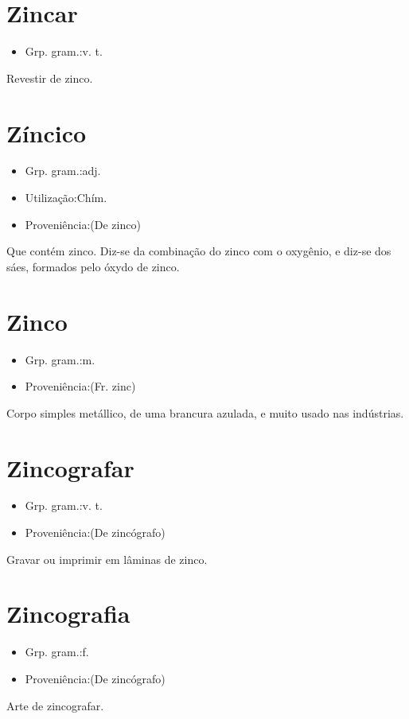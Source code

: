 \section{Zincar}
\begin{itemize}
\item {Grp. gram.:v. t.}
\end{itemize}
Revestir de zinco.
\section{Zíncico}
\begin{itemize}
\item {Grp. gram.:adj.}
\end{itemize}
\begin{itemize}
\item {Utilização:Chím.}
\end{itemize}
\begin{itemize}
\item {Proveniência:(De \textunderscore zinco\textunderscore )}
\end{itemize}
Que contém zinco.
Diz-se da combinação do zinco com o oxygênio, e diz-se dos sáes, formados pelo óxydo de zinco.
\section{Zinco}
\begin{itemize}
\item {Grp. gram.:m.}
\end{itemize}
\begin{itemize}
\item {Proveniência:(Fr. \textunderscore zinc\textunderscore )}
\end{itemize}
Corpo simples metállico, de uma brancura azulada, e muito usado nas indústrias.
\section{Zincografar}
\begin{itemize}
\item {Grp. gram.:v. t.}
\end{itemize}
\begin{itemize}
\item {Proveniência:(De \textunderscore zincógrafo\textunderscore )}
\end{itemize}
Gravar ou imprimir em lâminas de zinco.
\section{Zincografia}
\begin{itemize}
\item {Grp. gram.:f.}
\end{itemize}
\begin{itemize}
\item {Proveniência:(De \textunderscore zincógrafo\textunderscore )}
\end{itemize}
Arte de zincografar.
